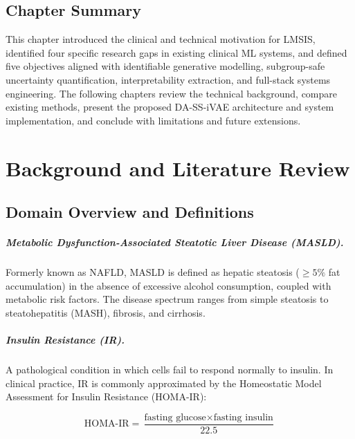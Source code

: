 \documentclass[12pt,a4paper,oneside]{report}
\newcommand{\daivae}{DA-SS-iVAE}
\begin{document}
\section{Chapter Summary}

This chapter introduced the clinical and technical motivation for LMSIS, identified four specific research gaps in existing clinical ML systems, and defined five objectives aligned with identifiable generative modelling, subgroup-safe uncertainty quantification, interpretability extraction, and full-stack systems engineering. The following chapters review the technical background, compare existing methods, present the proposed \daivae{} architecture and system implementation, and conclude with limitations and future extensions.

\chapter{Background and Literature Review}

\section{Domain Overview and Definitions}

\paragraph{Metabolic Dysfunction-Associated Steatotic Liver Disease (MASLD).} Formerly known as NAFLD, MASLD is defined as hepatic steatosis ($\geq 5\%$ fat accumulation) in the absence of excessive alcohol consumption, coupled with metabolic risk factors. The disease spectrum ranges from simple steatosis to steatohepatitis (MASH), fibrosis, and cirrhosis.

\paragraph{Insulin Resistance (IR).} A pathological condition in which cells fail to respond normally to insulin. In clinical practice, IR is commonly approximated by the Homeostatic Model Assessment for Insulin Resistance (HOMA-IR):
\begin{equationbox}
\[
\text{HOMA-IR} = \frac{\text{fasting glucose} \times \text{fasting insulin}}{22.5}
\]\vspace{-6pt}
\end{equationbox}
\end{document}
